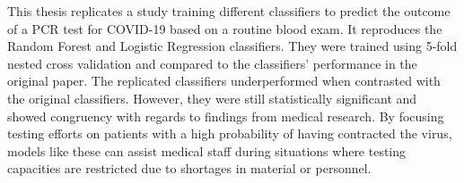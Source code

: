 This thesis replicates a study training different classifiers to predict the 
outcome of a PCR test for COVID-19 based on a routine blood exam. It 
reproduces the Random Forest and Logistic Regression classifiers. They were 
trained using 5-fold nested cross validation and compared to the classifiers' 
performance in the original paper. The replicated classifiers underperformed 
when contrasted with the original classifiers. However, they were still 
statistically significant and showed congruency with regards to findings from 
medical research. By focusing testing efforts on patients with a high 
probability of having contracted the virus, models like these can assist 
medical staff during situations where testing capacities are restricted due to 
shortages in material or personnel.
